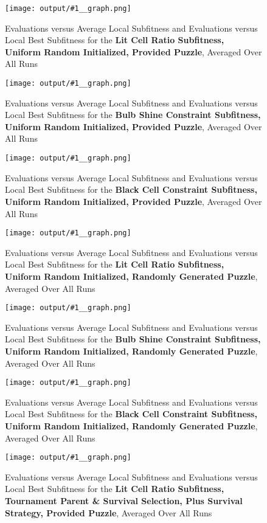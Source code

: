 \documentclass[11pt]{article}
\newcommand{\fitnessplotcaption}[1]{\caption{Evaluations versus Average Local Subfitness and Evaluations versus 
    Local Best Subfitness for the \textbf{{#1}}, Averaged Over All Runs}}
\newcommand{\addgraphic}[1]{\centerline{\texttt{[image: output/\#1\_\_graph.png]}}}
\begin{document}

\begin{figure}
    \addgraphic{website_puzzle/website_puzzle_uniform_random_init_lit_cell_ratio}
    \fitnessplotcaption{Lit Cell Ratio Subfitness, Uniform Random Initialized, Provided Puzzle}
    \label{fig:website_u_ratio}
\end{figure}

\begin{figure}
    \addgraphic{website_puzzle/website_puzzle_uniform_random_init_bulb_shine_constr}
    \fitnessplotcaption{Bulb Shine Constraint Subfitness, Uniform Random Initialized, Provided Puzzle}
    \label{fig:website_u_shine}
\end{figure}

\begin{figure}
    \addgraphic{website_puzzle/website_puzzle_uniform_random_init_black_cell_constr}
    \fitnessplotcaption{Black Cell Constraint Subfitness, Uniform Random Initialized, Provided Puzzle}
    \label{fig:website_u_black}
\end{figure}

\begin{figure}
    \addgraphic{random_gen/random_gen_uniform_random_init_lit_cell_ratio}
    \fitnessplotcaption{Lit Cell Ratio Subfitness, Uniform Random Initialized, Randomly Generated Puzzle}
    \label{fig:random_gen_u_ratio}
\end{figure}

\begin{figure}
    \addgraphic{random_gen/random_gen_uniform_random_init_bulb_shine_constr}
    \fitnessplotcaption{Bulb Shine Constraint Subfitness, Uniform Random Initialized, Randomly Generated Puzzle}
    \label{fig:random_gen_u_shine}
\end{figure}

\begin{figure}
    \addgraphic{random_gen/random_gen_uniform_random_init_black_cell_constr}
    \fitnessplotcaption{Black Cell Constraint Subfitness, Uniform Random Initialized, Randomly Generated Puzzle}
    \label{fig:random_gen_u_black}
\end{figure}



\begin{figure}
    \addgraphic{website_puzzle/website_puzzle__tournament_parent__tournament_survival__plus__lit_cell_ratio}
    \fitnessplotcaption{Lit Cell Ratio Subfitness, Tournament Parent \& Survival Selection, Plus
    Survival Strategy, Provided Puzzle}
    \label{fig:tourny_web1}
\end{figure}
\end{document}
